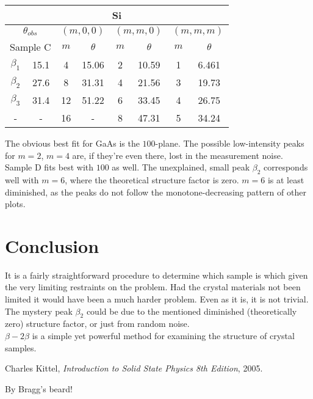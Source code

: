 \documentclass[a4paper,twoside=false,abstract=false,numbers=noenddot,
titlepage=false,headings=small,parskip=half,version=last]{scrartcl}
\begin{document}
\begin{tabular}{ |c|c|c|c|c|c|c|c| }
	\hline
    \multicolumn{8}{|c|}{Si}\\
    \hline
    \multicolumn{2}{|c|}{$\theta_{obs}$}
	& \multicolumn{2}{|c|}{$(m,0,0)$}
	& \multicolumn{2}{|c|}{$(m,m,0)$}
	& \multicolumn{2}{|c|}{$(m,m,m)$}\\
    \hline
	\multicolumn{2}{|c|}{Sample C}& $m$ & $\theta$ & $m$ & $\theta$ & $m$ & $\theta$ \\
	\hline
    $\beta_1$	& 15.1\degree	& 4		& 15.06\degree	& 2	& 10.59\degree	& 1	& 6.461\degree	\\
    $\beta_2$	& 27.6\degree	& 8		& 31.31\degree	& 4	& 21.56\degree	& 3	& 19.73\degree	\\
    $\beta_3$	& 31.4\degree	& 12	& 51.22\degree	& 6	& 33.45\degree	& 4	& 26.75\degree	\\
    -			& -				& 16	& -				& 8	& 47.31\degree	& 5	& 34.24\degree	\\
	\hline
\end{tabular}

The obvious best fit for GaAs is the $100$-plane.
The possible low-intensity peaks for $m=2$, $m=4$ are, if they're even there, lost in the measurement noise.\\
Sample D fits best with $100$ as well.
The unexplained, small peak $\beta_2$ corresponds well with $m=6$,
where the theoretical structure factor is zero.
$m=6$ is at least diminished,
as the peaks do not follow the monotone-decreasing pattern of other plots.

\section{Conclusion}
It is a fairly straightforward procedure to determine which sample is which given the very limiting restraints on the problem.
Had the crystal materials not been limited it would have been a much harder problem. Even as it is, it is not trivial.
The mystery peak $\beta_2$ could be due to the mentioned diminished (theoretically zero) structure factor, or just from random noise.\\
$\beta-2\beta$ is a simple yet powerful method for examining the structure of crystal samples.

\begin{thebibliography}{1}
        Charles Kittel,
        {\em Introduction to Solid State Physics 8th Edition},
        2005.
\end{thebibliography}


\textcolor{braggred}{By Bragg's beard!}
\end{document}

